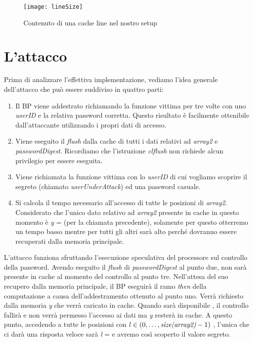 		\begin{figure}
			\begin{center}
				\texttt{[image: lineSize]}
				\caption{Contenuto di una cache line nel nostro setup}
				\label{fig:lineSize}
			\end{center}
		\end{figure}
		
		\section{L'attacco}
			Prima di analizzare l'effettiva implementazione, vediamo l'idea generale dell'attacco che può essere suddiviso in quattro parti:
			
			\begin{enumerate}
				\item Il \ac{BP} viene addestrato richiamando la funzione vittima per tre volte con uno \emph{userID} e la relativa password corretta. Questo risultato è facilmente ottenibile dall'attaccante utilizzando i propri dati di accesso.
				\item Viene eseguito il \emph{flush} dalla cache di tutti i dati relativi ad \emph{array2} e \emph{passwordDigest}. Ricordiamo che l'istruzione \emph{clflush} non richiede alcun privilegio per essere eseguita.
				\item Viene richiamata la funzione vittima con lo \emph{userID} di cui vogliamo scoprire il segreto (chiamato \emph{userUnderAttack}) ed una password casuale.
				\item Si calcola il tempo necessario all'accesso di tutte le posizioni di \emph{array2}. Considerato che l'unico dato relativo ad \emph{array2} presente in cache in questo momento è \emph{y} =  (per la chiamata precedente), solamente per questo otterremo un tempo basso mentre per tutti gli altri sarà alto perché dovranno essere recuperati dalla memoria principale.
			\end{enumerate}
		
			L'attacco funziona sfruttando l'esecuzione speculativa del processore sul controllo della password. Avendo eseguito il \emph{flush} di \emph{passwordDigest} al punto due,  non sarà presente in cache al momento del controllo al punto tre. Nell'attesa del suo recupero dalla memoria principale, il \ac{BP} eseguirà il ramo \emph{then} della computazione a causa dell'addestramento ottenuto al punto uno. Verrà richiesto dalla memoria \emph{y} che verrà caricato in cache. Quando sarà disponibile , il controllo fallirà e non verrà permesso l'accesso ai dati ma \emph{y} resterà in cache. A questo punto, accedendo a tutte le posizioni  con \emph{l} $\in (0,\dots,\text{\emph{size(array2)}}-1)$ , l'unica che ci darà una risposta veloce sarà \emph{l} =  e avremo così scoperto il valore segreto.
			
